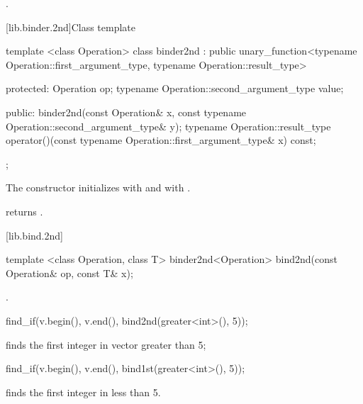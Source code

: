 \begin{itemdescr}
\pnum
\returns
{}.
\end{itemdescr}

[lib.binder.2nd]{Class template }

%
\begin{itemdecl}
  template <class Operation>
  class binder2nd
    : public unary_function<typename Operation::first_argument_type,
                            typename Operation::result_type> {
  protected:
    Operation                       op;
    typename Operation::second_argument_type value;

  public:
    binder2nd(const Operation& x,
              const typename Operation::second_argument_type& y);
    typename Operation::result_type
      operator()(const typename Operation::first_argument_type& x) const;
  };
\end{itemdecl}

\begin{itemdescr}
\pnum
The constructor initializes  with  and 
with .

\pnum
{} returns .
\end{itemdescr}

[lib.bind.2nd]{}

%
\begin{itemdecl}
template <class Operation, class T>
  binder2nd<Operation> bind2nd(const Operation& op, const T& x);
\end{itemdecl}

\begin{itemdescr}
\pnum
\returns
{}.

\pnum
\enterexample
\begin{codeblock}
find_if(v.begin(), v.end(), bind2nd(greater<int>(), 5));
\end{codeblock}

finds the first integer in vector  greater than 5;

\begin{codeblock}
find_if(v.begin(), v.end(), bind1st(greater<int>(), 5));
\end{codeblock}

finds the first integer in  less than 5.
\exitexampleb
\end{itemdescr}

